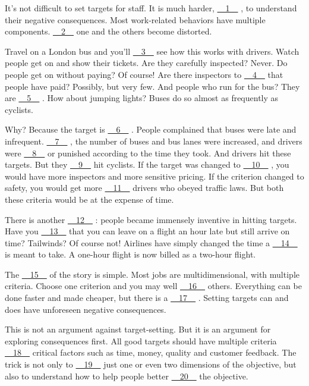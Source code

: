 It's not difficult to set targets for staff. It is much harder, \uline{~~1~~} , to understand their negative consequences. Most work-related behaviors have multiple components. \uline{~~2~~} one and the others become distorted.


Travel on a London bus and you'll \uline{~~3~~} see how this works with drivers. Watch people get on and show their tickets. Are they carefully inspected? Never. Do people get on without paying? Of course! Are there inspectors to \uline{~~4~~} that people have paid? Possibly, but very few. And people who run for the bus? They are \uline{~~5~~} . How about jumping lights? Buses do so almost as frequently as cyclists.


Why? Because the target is \uline{~~6~~} . People complained that buses were late and infrequent. \uline{~~7~~} , the number of buses and bus lanes were increased, and drivers were \uline{~~8~~} or punished according to the time they took. And drivers hit these targets. But they \uline{~~9~~} hit cyclists. If the target was changed to \uline{~~10~~} , you would have more inspectors and more sensitive pricing. If the criterion changed to safety, you would get more \uline{~~11~~} drivers who obeyed traffic laws. But both these criteria would be at the expense of time.


There is another \uline{~~12~~} : people became immensely inventive in hitting targets. Have you \uline{~~13~~} that you can leave on a flight an hour late but still arrive on time? Tailwinds? Of course not! Airlines have simply changed the time a \uline{~~14~~} is meant to take. A one-hour flight is now billed as a two-hour flight.


The \uline{~~15~~} of the story is simple. Most jobs are multidimensional, with multiple criteria. Choose one criterion and you may well \uline{~~16~~} others. Everything can be done faster and made cheaper, but there is a \uline{~~17~~} . Setting targets can and does have unforeseen negative consequences.


This is not an argument against target-setting. But it is an argument for exploring consequences first. All good targets should have multiple criteria \uline{~~18~~} critical factors such as time, money, quality and customer feedback. The trick is not only to \uline{~~19~~} just one or even two dimensions of the objective, but also to understand how to help people better \uline{~~20~~} the objective.